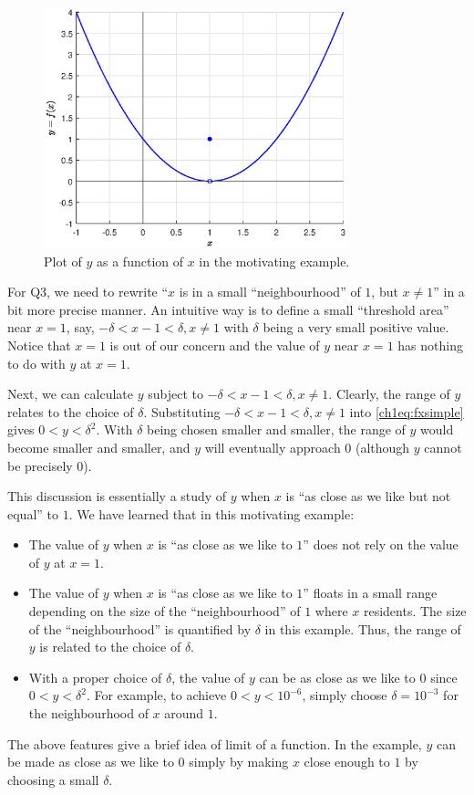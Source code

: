 \begin{figure}
\centering
\includegraphics[width=250pt]{chapters/chapter1/figures/fig_fxsimple.eps}
\caption{Plot of $y$ as a function of $x$ in the motivating example.} \label{ch1fig:fxsimpleexample}
\end{figure}

For Q3, we need to rewrite ``$x$ is in a small ``neighbourhood'' of $1$, but $x \neq 1$'' in a bit more precise manner. An intuitive way is to define a small ``threshold area'' near $x=1$, say, $-\delta < x-1 < \delta, x \neq 1$ with $\delta$ being a very small positive value. Notice that $x=1$ is out of our concern and the value of $y$ near $x=1$ has nothing to do with $y$ at $x=1$.

Next, we can calculate $y$ subject to $-\delta < x-1 < \delta, x \neq 1$. Clearly, the range of $y$ relates to the choice of $\delta$. Substituting $-\delta < x-1 < \delta, x \neq 1$ into \eqref{ch1eq:fxsimple} gives $0 < y < \delta^2$. With $\delta$ being chosen smaller and smaller, the range of $y$ would become smaller and smaller, and $y$ will eventually approach $0$ (although $y$ cannot be precisely $0$).

This discussion is essentially a study of $y$ when $x$ is ``as close as we like but not equal'' to $1$. We have learned that in this motivating example:
\begin{itemize}
  \item The value of $y$ when $x$ is ``as close as we like to $1$'' does not rely on the value of $y$ at $x = 1$.
  \item The value of $y$ when $x$ is ``as close as we like to $1$'' floats in a small range depending on the size of the ``neighbourhood'' of $1$ where $x$ residents. The size of the ``neighbourhood'' is quantified by $\delta$ in this example. Thus, the range of $y$ is related to the choice of $\delta$.
  \item With a proper choice of $\delta$, the value of $y$ can be as close as we like to $0$ since $0 < y < \delta^2$. For example, to achieve $0 < y < 10^{-6}$, simply choose $\delta = 10^{-3}$ for the neighbourhood of $x$ around $1$.
\end{itemize}
The above features give a brief idea of limit of a function. In the example, $y$ can be made as close as we like to $0$ simply by making $x$ close enough to $1$ by choosing a small $\delta$.

